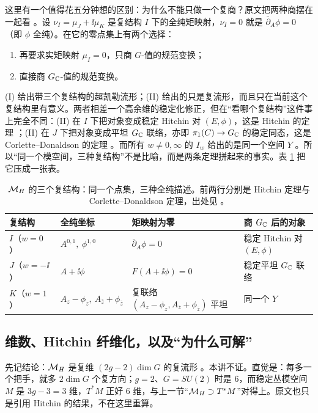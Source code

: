 这里有一个值得花五分钟想的区别：为什么不能只做一个复商？原文把两种商摆在一起看 。设 $\nu_I=\mu_J+\ii\mu_K$ 是复结构 $I$ 下的全纯矩映射，$\nu_I=0$ 就是 $\bar\partial_A\phi=0$（即 $\phi$ 全纯）。在它的零点集上有两个选择：

\begin{enumerate}
\item[(I)] 再要求实矩映射 $\mu_I=0$，只商 $G$-值的规范变换；
\item[(II)] 直接商 $G_{\mathbb{C}}$-值的规范变换。
\end{enumerate}

(I) 给出带三个复结构的超凯勒流形；(II) 给出的只是复流形，而且只在当前这个复结构里有意义。两者相差一个高余维的稳定化修正，但在“看哪个复结构”这件事上完全不同：(II) 在 $I$ 下把对象变成稳定 Hitchin 对 $(E,\phi)$，这是 Hitchin 的定理 ；(II) 在 $J$ 下把对象变成平坦 $G_{\mathbb{C}}$ 联络，亦即 $\pi_1(C)\to G_{\mathbb{C}}$ 的稳定同态，这是 Corlette--Donaldson 的定理 。而所有 $w\ne0,\infty$ 的 $I_w$ 给出的是同一个空间 $Y$ 。所以“同一个模空间，三种复结构”不是比喻，而是两条定理拼起来的事实。表 \ref{tab:three-I} 把它压成一张表。

\begin{table}[htbp]
\centering
\small
\begin{tabular}{@{}llll@{}}
\toprule
复结构 & 全纯坐标 & 矩映射为零 & 商 $G_{\mathbb{C}}$ 后的对象 \\
\midrule
$I$（$w=0$） & $A^{0,1},\ \phi^{1,0}$ & $\bar\partial_A\phi=0$ & 稳定 Hitchin 对 $(E,\phi)$ \\
$J$（$w=-\ii$） & $A+\ii\phi$ & $F(A+\ii\phi)=0$ & 稳定平坦 $G_{\mathbb{C}}$ 联络 \\
$K$（$w=1$） & $A_z-\phi_z,\ A_{\bar z}+\phi_{\bar z}$ & 复联络 $(A_z-\phi_z,A_{\bar z}+\phi_{\bar z})$ 平坦 & 同一个 $Y$ \\
\bottomrule
\end{tabular}
\caption{$\mathcal{M}_{H}$ 的三个复结构：同一个点集，三种全纯描述。前两行分别是 Hitchin 定理与 Corlette--Donaldson 定理，出处见 。}
\label{tab:three-I}
\end{table}

\subsection{维数、Hitchin 纤维化，以及“为什么可解”}

先记结论：$\mathcal{M}_{H}$ 是复维 $(2g-2)\dim G$ 的复流形 。本讲不证。直觉是：每多一个把手，就多 $2\dim G$ 个复方向；$g=2$、$G=SU(2)$ 时是 $6$，而稳定丛模空间 $M$ 是 $3g-3=3$ 维，$T^*M$ 正好 $6$ 维，与上一节“$\mathcal{M}_{H}\supset T^*M$”对得上。原文也只是引用 Hitchin 的结果，不在这里重算。

